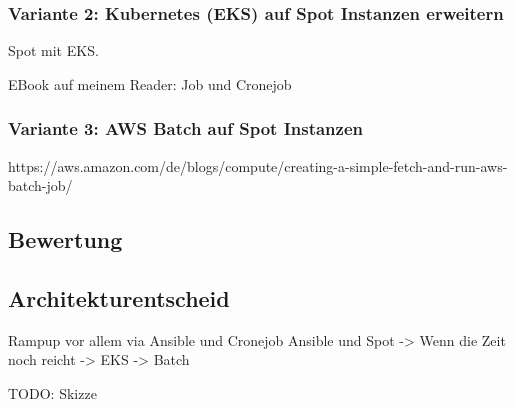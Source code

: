 \subsubsection{Variante 2: Kubernetes (EKS) auf Spot Instanzen erweitern}
Spot mit EKS. 

EBook auf meinem Reader: Job und Cronejob

\subsubsection{Variante 3: AWS Batch auf Spot Instanzen}

https://aws.amazon.com/de/blogs/compute/creating-a-simple-fetch-and-run-aws-batch-job/


\subsection{Bewertung}

\subsection{Architekturentscheid}
Rampup vor allem via Ansible und Cronejob
Ansible und Spot -> Wenn die Zeit noch reicht -> EKS -> Batch

TODO: Skizze
